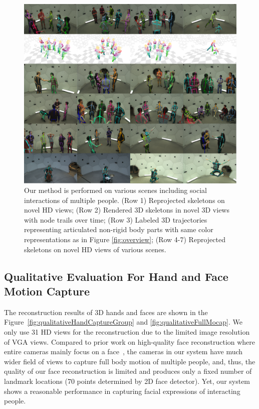 \begin{figure}[t]
	\centering
	\includegraphics[trim=0 0 0 0,clip,width=\linewidth]{figures/0916_qualitative}
	\caption{ Our method is performed on various scenes including social interactions of multiple people. (Row 1) Reprojected skeletons on novel HD views; (Row 2) Rendered 3D skeletons in novel 3D views with node trails over time; (Row 3) Labeled 3D trajectories representing articulated non-rigid body parts with same color representations as in Figure \ref{fig:overview}; (Row 4-7) Reprojected skeletons on novel HD views of various scenes.}
	\label{fig:qualitativeSocial}
\end{figure}

\subsection{Qualitative Evaluation For Hand and Face Motion Capture}
The reconstruction results of 3D hands and faces are shown in the Figure~\ref{fig:qualitativeHandCaptureGroup} and \ref{fig:qualitativeFullMocap}. We only use 31 HD views for the reconstruction due to the limited image resolution of VGA views. Compared to prior work on high-quality face reconstruction where entire cameras mainly focus on a face~\cite{beeler2010high},  the cameras in our system have much wider field of views to capture full body motion of multiple people, and, thus, the quality of our face reconstruction is limited and produces only a fixed number of landmark locations (70 points determined by 2D face detector). Yet, our system shows a reasonable performance in capturing facial expressions of interacting people.

